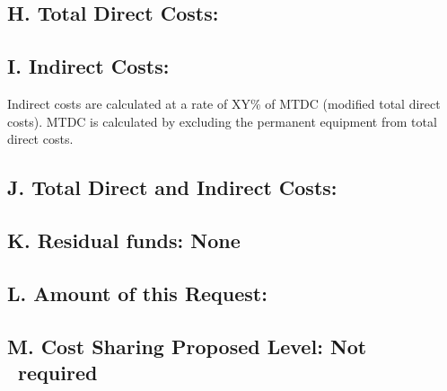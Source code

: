 \subsection{H. Total Direct Costs: }

\subsection{I. Indirect Costs:}
Indirect costs are calculated at a rate of XY\% of MTDC (modified total direct costs). MTDC is calculated by excluding the permanent equipment from
total direct costs.


\subsection{ J. Total Direct and Indirect Costs: }

\subsection{K. Residual funds: {\normalfont None}}

\subsection{\textbf{L. Amount of this Request: }}

\subsection{M. Cost Sharing Proposed Level: {\normalfont Not ~required}}

